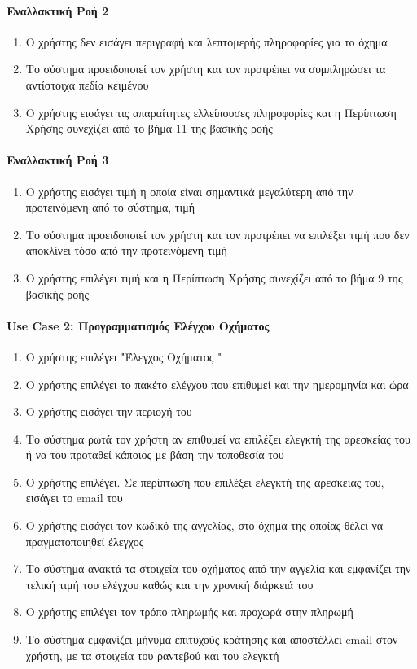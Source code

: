 \documentclass{../ol-softwaremanual}
\begin{document}
	\paragraph{Εναλλακτική Ροή 2}
	
	\begin{enumerate}
		\item Ο χρήστης δεν εισάγει περιγραφή και λεπτομερής πληροφορίες για το όχημα
		\item Το σύστημα προειδοποιεί τον χρήστη και τον προτρέπει να συμπληρώσει τα αντίστοιχα πεδία κειμένου
		\item Ο χρήστης εισάγει τις απαραίτητες ελλείπουσες πληροφορίες και η Περίπτωση Χρήσης συνεχίζει από το βήμα 11 της βασικής ροής
	\end{enumerate}

	\paragraph{Εναλλακτική Ροή 3}
	
	\begin{enumerate}
		\item Ο χρήστης εισάγει τιμή η οποία είναι σημαντικά μεγαλύτερη από την προτεινόμενη από το σύστημα, τιμή
		\item Το σύστημα προειδοποιεί τον χρήστη και τον προτρέπει να επιλέξει τιμή που δεν αποκλίνει τόσο από την προτεινόμενη τιμή
		\item Ο χρήστης επιλέγει τιμή και η Περίπτωση Χρήσης συνεχίζει από το βήμα 9 της βασικής ροής
	\end{enumerate}
	
	
	\paragraph{\en Use Case 2: \gr Προγραμματισμός Ελέγχου Οχήματος}
	
	\begin{enumerate}
		\item Ο χρήστης επιλέγει \en"\gr Έλεγχος Οχήματος \en"\gr
		\item Ο χρήστης επιλέγει το πακέτο ελέγχου που επιθυμεί και την ημερομηνία και ώρα
		\item Ο χρήστης εισάγει την περιοχή του
		\item Το σύστημα ρωτά τον χρήστη αν επιθυμεί να επιλέξει ελεγκτή της αρεσκείας του ή να του προταθεί κάποιος με βάση την τοποθεσία του
		\item Ο χρήστης επιλέγει. Σε περίπτωση που επιλέξει ελεγκτή της αρεσκείας του, εισάγει το \en email \gr του
		\item Ο χρήστης εισάγει τον κωδικό της αγγελίας, στο όχημα της οποίας θέλει να πραγματοποιηθεί έλεγχος
		\item Το σύστημα ανακτά τα στοιχεία του οχήματος από την αγγελία και εμφανίζει την τελική τιμή του ελέγχου καθώς και την χρονική διάρκειά του
		\item Ο χρήστης επιλέγει τον τρόπο πληρωμής και προχωρά στην πληρωμή 
		\item Το σύστημα εμφανίζει μήνυμα επιτυχούς κράτησης και αποστέλλει \en email \gr στον χρήστη, με τα στοιχεία του ραντεβού και του ελεγκτή		
	\end{enumerate}
\end{document}
